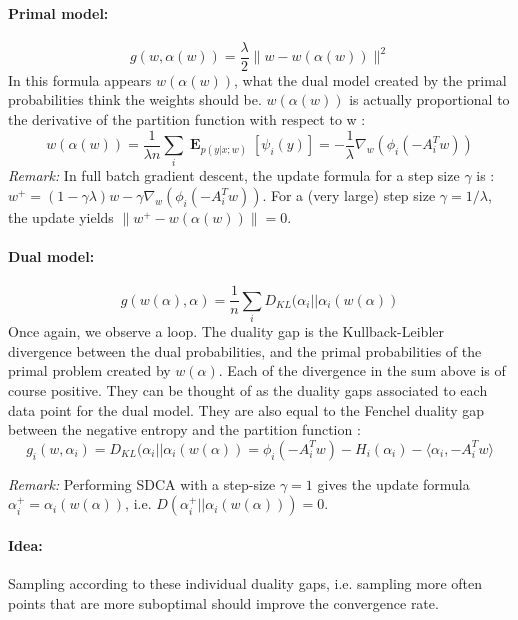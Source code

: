 \documentclass{article}
\DeclareMathOperator{\1}{\mathbb{1}}
\DeclareMathOperator{\E}{\mathbf{E}}
\begin{document}
\paragraph{Primal model:}
\begin{equation}
	g(w,\alpha(w)) = \frac{\lambda}{2} \|w-w(\alpha(w))\|^2
\end{equation}
In this formula appears $w(\alpha(w))$, what the dual model created by the primal probabilities think the weights should be. 
$w(\alpha(w))$ is actually proportional to the derivative of the partition function with respect to w :
\begin{equation}
	w(\alpha(w)) =  \frac{1}{\lambda n} \sum_i  \E_{p(y|x ; w)} [\psi_i(y)] = - \frac{1}{\lambda} \nabla_w(\phi_i(-A_i^Tw))
\end{equation}
\textit{Remark:} In  full batch gradient descent, the update formula for a step size $\gamma$ is  : $w^+ = (1-\gamma\lambda)w - \gamma \nabla_w(\phi_i(-A_i^Tw))$.  For a (very large) step size $\gamma = 1/\lambda$, the update yields $\|w^+ - w(\alpha(w))\| = 0$.

\paragraph{Dual model:}

\begin{equation}
	g(w(\alpha),\alpha) = \frac{1}{n} \sum_i D_{KL} (\alpha_i || \alpha_i(w(\alpha))
\end{equation}
Once again, we observe a loop.
The duality gap is the Kullback-Leibler divergence between the dual probabilities, and the primal  probabilities of the primal problem created by $w(\alpha)$.
Each of the divergence in the sum above is of course positive.
They can be thought of as the duality gaps associated to each data point for the dual model.
They are also equal to the Fenchel duality gap between the negative entropy and the partition function :
\begin{equation*}
	g_i(w,\alpha_i) = D_{KL} (\alpha_i || \alpha_i(w(\alpha)) = \phi_i(-A_i^T w) - H_i(\alpha_i) - \langle \alpha_i, -A_i^T w\rangle 
\end{equation*}

\textit{Remark:} Performing SDCA with a step-size $\gamma=1$ gives the update formula $\alpha_i^+ = \alpha_i(w(\alpha))$, i.e. $ D(\alpha_i^+ || \alpha_i(w(\alpha)) )=0$. 

\paragraph{Idea:} Sampling according to these individual duality gaps, i.e. sampling more often points that are more suboptimal should improve the convergence rate.
\end{document}
